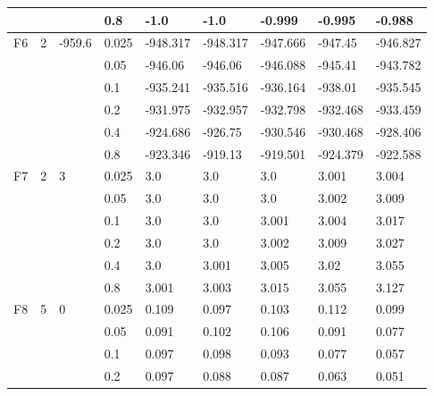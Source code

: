 \begin{longtable}{|l|l|l|l|l|l|l|l|l|}
\cmidrule{4-9} &     &          & 0.8            & -1.0       & -1.0       & -0.999     & -0.995     & -0.988     \\ \midrule
F6             & 2   & -959.6   & 0.025          & -948.317   & -948.317   & -947.666   & -947.45    & -946.827   \\
\cmidrule{4-9} &     &          & 0.05           & -946.06    & -946.06    & -946.088   & -945.41    & -943.782   \\
\cmidrule{4-9} &     &          & 0.1            & -935.241   & -935.516   & -936.164   & -938.01    & -935.545   \\
\cmidrule{4-9} &     &          & 0.2            & -931.975   & -932.957   & -932.798   & -932.468   & -933.459   \\
\cmidrule{4-9} &     &          & 0.4            & -924.686   & -926.75    & -930.546   & -930.468   & -928.406   \\
\cmidrule{4-9} &     &          & 0.8            & -923.346   & -919.13    & -919.501   & -924.379   & -922.588   \\ \midrule
F7             & 2   & 3        & 0.025          & 3.0        & 3.0        & 3.0        & 3.001      & 3.004      \\
\cmidrule{4-9} &     &          & 0.05           & 3.0        & 3.0        & 3.0        & 3.002      & 3.009      \\
\cmidrule{4-9} &     &          & 0.1            & 3.0        & 3.0        & 3.001      & 3.004      & 3.017      \\
\cmidrule{4-9} &     &          & 0.2            & 3.0        & 3.0        & 3.002      & 3.009      & 3.027      \\
\cmidrule{4-9} &     &          & 0.4            & 3.0        & 3.001      & 3.005      & 3.02       & 3.055      \\
\cmidrule{4-9} &     &          & 0.8            & 3.001      & 3.003      & 3.015      & 3.055      & 3.127      \\ \midrule
F8             & 5   & 0        & 0.025          & 0.109      & 0.097      & 0.103      & 0.112      & 0.099      \\
\cmidrule{4-9} &     &          & 0.05           & 0.091      & 0.102      & 0.106      & 0.091      & 0.077      \\
\cmidrule{4-9} &     &          & 0.1            & 0.097      & 0.098      & 0.093      & 0.077      & 0.057      \\
\cmidrule{4-9} &     &          & 0.2            & 0.097      & 0.088      & 0.087      & 0.063      & 0.051      \\

\end{longtable}
